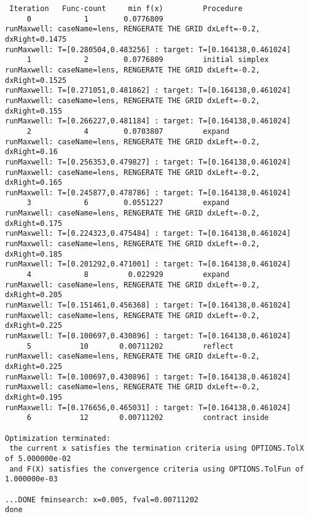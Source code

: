 \documentclass[11pt]{article}
\begin{document}
{\begin{verbatim}
 Iteration   Func-count     min f(x)         Procedure
     0            1        0.0776809         
runMaxwell: caseName=lens, RENGERATE THE GRID dxLeft=-0.2, dxRight=0.1475
runMaxwell: T=[0.280504,0.483256] : target: T=[0.164138,0.461024]
     1            2        0.0776809         initial simplex
runMaxwell: caseName=lens, RENGERATE THE GRID dxLeft=-0.2, dxRight=0.1525
runMaxwell: T=[0.271051,0.481862] : target: T=[0.164138,0.461024]
runMaxwell: caseName=lens, RENGERATE THE GRID dxLeft=-0.2, dxRight=0.155
runMaxwell: T=[0.266227,0.481184] : target: T=[0.164138,0.461024]
     2            4        0.0703807         expand
runMaxwell: caseName=lens, RENGERATE THE GRID dxLeft=-0.2, dxRight=0.16
runMaxwell: T=[0.256353,0.479827] : target: T=[0.164138,0.461024]
runMaxwell: caseName=lens, RENGERATE THE GRID dxLeft=-0.2, dxRight=0.165
runMaxwell: T=[0.245877,0.478786] : target: T=[0.164138,0.461024]
     3            6        0.0551227         expand
runMaxwell: caseName=lens, RENGERATE THE GRID dxLeft=-0.2, dxRight=0.175
runMaxwell: T=[0.224323,0.475484] : target: T=[0.164138,0.461024]
runMaxwell: caseName=lens, RENGERATE THE GRID dxLeft=-0.2, dxRight=0.185
runMaxwell: T=[0.201292,0.471001] : target: T=[0.164138,0.461024]
     4            8         0.022929         expand
runMaxwell: caseName=lens, RENGERATE THE GRID dxLeft=-0.2, dxRight=0.205
runMaxwell: T=[0.151461,0.456368] : target: T=[0.164138,0.461024]
runMaxwell: caseName=lens, RENGERATE THE GRID dxLeft=-0.2, dxRight=0.225
runMaxwell: T=[0.100697,0.430896] : target: T=[0.164138,0.461024]
     5           10       0.00711202         reflect
runMaxwell: caseName=lens, RENGERATE THE GRID dxLeft=-0.2, dxRight=0.225
runMaxwell: T=[0.100697,0.430896] : target: T=[0.164138,0.461024]
runMaxwell: caseName=lens, RENGERATE THE GRID dxLeft=-0.2, dxRight=0.195
runMaxwell: T=[0.176656,0.465031] : target: T=[0.164138,0.461024]
     6           12       0.00711202         contract inside
 
Optimization terminated:
 the current x satisfies the termination criteria using OPTIONS.TolX of 5.000000e-02 
 and F(X) satisfies the convergence criteria using OPTIONS.TolFun of 1.000000e-03 

...DONE fminsearch: x=0.005, fval=0.00711202
done
\end{verbatim}
}


  
\end{document}
